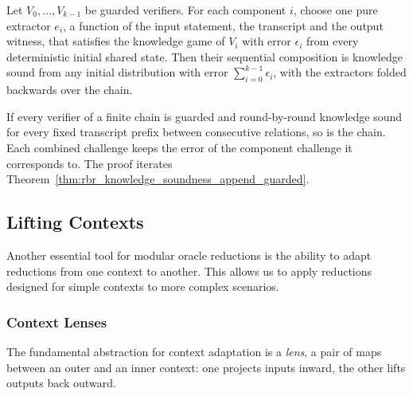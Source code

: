 \begin{theorem}
    \label{thm:knowledge_soundness_compose}
    Let $V_0, \ldots, V_{k-1}$ be guarded verifiers. For each component $i$, choose one pure
    extractor $e_i$, a function of the input statement, the transcript and the output witness, that
    satisfies the knowledge game of $V_i$ with error $\epsilon_i$ from every deterministic initial
    shared state. Then their
    sequential composition is knowledge sound from any initial distribution with error
    $\sum_{i=0}^{k-1} \epsilon_i$, with the extractors folded backwards over the chain.
    \leanok
\end{theorem}

\begin{theorem}
    \label{thm:rbr_knowledge_soundness_compose_guarded}
    If every verifier of a finite chain is guarded and round-by-round knowledge sound for every
    fixed transcript prefix between consecutive relations, so is the chain. Each combined
    challenge keeps the error of the component challenge it corresponds to. The proof iterates
    Theorem~\ref{thm:rbr_knowledge_soundness_append_guarded}.
    \leanok
\end{theorem}

\subsection{Lifting Contexts}\label{sec:lifting_contexts}

Another essential tool for modular oracle reductions is the ability to adapt reductions from one context to another. This allows us to apply reductions designed for simple contexts to more complex scenarios.

\subsubsection{Context Lenses}

The fundamental abstraction for context adaptation is a \emph{lens}, a pair of maps between an outer
and an inner context: one projects inputs inward, the other lifts outputs back outward.

